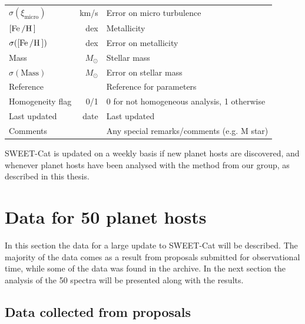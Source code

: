 \begin{table}[htb!]
\begin{tabular}{lrl}
      $\sigma(\xi_\mathrm{micro})$   & \si{km/s} & Error on micro turbulence                            \\
      $[\ion{Fe}/\ion{H}]$           & \si{dex}  & Metallicity                                          \\
      $\sigma([\ion{Fe}/\ion{H}])$   & \si{dex}  & Error on metallicity                                 \\
      Mass                           & $M_\odot$ & Stellar mass                                         \\
      $\sigma(\mathrm{Mass})$        & $M_\odot$ & Error on stellar mass                                \\
      Reference                      &           & Reference for parameters                             \\
      Homogeneity flag               & 0/1       & 0 for not homogeneous analysis, 1 otherwise          \\
      Last updated                   & date      & Last updated                                         \\
      Comments                       &           & Any special remarks/comments (e.g. M star)           \\
      \hline
    \end{tabular}
\end{table}

SWEET-Cat is updated on a weekly basis if new planet hosts are discovered, and whenever planet hosts
have been analysed with the method from our group, as described in this thesis.


\section{Data for 50 planet hosts}

In this section the data for a large update to SWEET-Cat will be described. The majority of the data
comes as a result from proposals submitted for observational time, while some of the data was found
in the archive. In the next section the analysis of the 50 spectra will be presented along with the
results.



\subsection{Data collected from proposals}

